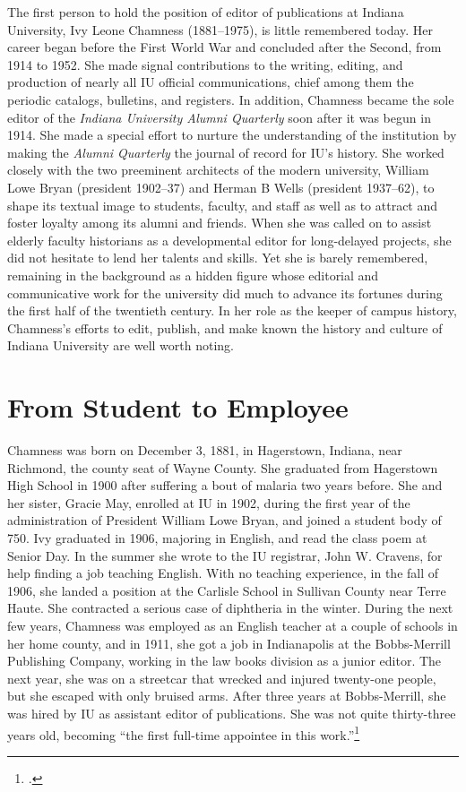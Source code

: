 \documentclass[
  american,
  letterpaper,
]{scrreprt}
\begin{document}
The first person to hold the position of editor of publications at
Indiana University, Ivy Leone Chamness (1881--1975), is little
remembered today. Her career began before the First World War and
concluded after the Second, from 1914 to 1952. She made signal
contributions to the writing, editing, and production of nearly all IU
official communications, chief among them the periodic catalogs,
bulletins, and registers. In addition, Chamness became the sole editor
of the \emph{Indiana University Alumni Quarterly} soon after it was
begun in 1914. She made a special effort to nurture the understanding of
the institution by making the \emph{Alumni Quarterly} the journal of
record for IU's history. She worked closely with the two preeminent
architects of the modern university, William Lowe Bryan (president
1902--37) and Herman B Wells (president 1937--62), to shape its textual
image to students, faculty, and staff as well as to attract and foster
loyalty among its alumni and friends. When she was called on to assist
elderly faculty historians as a developmental editor for long-delayed
projects, she did not hesitate to lend her talents and skills. Yet she
is barely remembered, remaining in the background as a hidden figure
whose editorial and communicative work for the university did much to
advance its fortunes during the first half of the twentieth century. In
her role as the keeper of campus history, Chamness's efforts to edit,
publish, and make known the history and culture of Indiana University
are well worth noting.

\section{From Student to Employee}\label{from-student-to-employee}

Chamness was born on December 3, 1881, in Hagerstown, Indiana, near
Richmond, the county seat of Wayne County. She graduated from Hagerstown
High School in 1900 after suffering a bout of malaria two years before.
She and her sister, Gracie May, enrolled at IU in 1902, during the first
year of the administration of President William Lowe Bryan, and joined a
student body of 750. Ivy graduated in 1906, majoring in English, and
read the class poem at Senior Day. In the summer she wrote to the IU
registrar, John W. Cravens, for help finding a job teaching English.
With no teaching experience, in the fall of 1906, she landed a position
at the Carlisle School in Sullivan County near Terre Haute. She
contracted a serious case of diphtheria in the winter. During the next
few years, Chamness was employed as an English teacher at a couple of
schools in her home county, and in 1911, she got a job in Indianapolis
at the Bobbs-Merrill Publishing Company, working in the law books
division as a junior editor. The next year, she was on a streetcar that
wrecked and injured twenty-one people, but she escaped with only bruised
arms. After three years at Bobbs-Merrill, she was hired by IU as
assistant editor of publications. She was not quite thirty-three years
old, becoming ``the first full-time appointee in this work.''\footnote{.}
\end{document}
